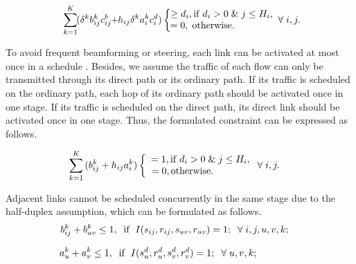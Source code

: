 \documentclass[journal]{IEEEtran}
\begin{document}
\begin{equation}\hspace{0.2cm}
\sum\limits_{k = 1}^K \hspace{-0.1cm}{({\delta ^k}  b_{ij}^k  {c_{ij}^b}\hspace{-0.1cm} +
\hspace{-0.1cm}{h_{ij}}{\delta ^k} a_i^k c_i^d)} \left\{ {\begin{array}{*{20}{c}}
{\hspace{-0.2cm} \ge {d_i},{\rm{if}}\;{d_i} > 0\;\&\;j \le {H_i}},\\
{\hspace{-0.2cm}=0,\;{\rm{otherwise}}.\hspace{1.4cm}}
\end{array}\forall \;i,j.} \right.\label{CONS5}
\end{equation}

To avoid frequent beamforming or steering, each link can be activated at most once in a schedule
\cite{mao}. Besides, we assume the traffic of each flow can only be transmitted through its direct
path or its ordinary path. If its traffic is scheduled on the ordinary path, each hop of its
ordinary path should be activated once in one stage. If its traffic is scheduled on the direct
path, its direct link should be activated once in one stage. Thus, the formulated constraint can be
expressed as follows.

\begin{equation}
\sum\limits_{k = 1}^K {(b_{ij}^k + {h_{ij}}a_i^k)} \left\{ {\begin{array}{*{20}{c}}
{ = 1,{\rm{if}}\;{d_i} > 0\;\&\;j \le {H_i}},\\
{ = 0,{\rm{otherwise}}.\hspace{1.3cm}}
\end{array}} \right.\forall\;i,j.\hspace{0.4cm}\label{CONS4}
\end{equation}

Adjacent links cannot be scheduled concurrently in the same stage due to the half-duplex
assumption, which can be formulated as follows.
\begin{equation}
b_{ij}^k + b_{uv}^k \le 1,\;\; {\rm{if}} \;\;I({s_{ij}},{r_{ij}},{{s_{uv}},{r_{uv}}} ) =1;
\;\;\forall \;i,j,u,v,k; \hspace{0.4cm}\label{CONS7}
\end{equation}

\begin{equation}
a_u^k + a_v^k \le 1, \;\;{\rm{if}} \;\;I(s_u^d,r_u^d,s_v^d,r_v^d)=1; \;\;\forall
\;u,v,k;\hspace{1.6cm}\label{CONS8}
\end{equation}
\end{document}
